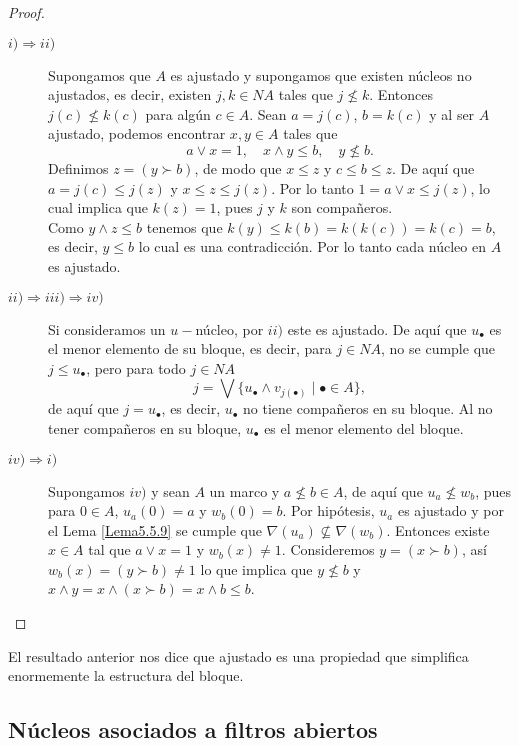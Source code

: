 \begin{proof}
    \begin{description}
        \item[$i)\Rightarrow ii) $] Supongamos que $A$ es ajustado y supongamos que existen núcleos no ajustados, es decir, existen $j, k\in NA$ tales que $j\nleq k$. Entonces $j(c)\nleq k(c)$ para algún $c\in A$. Sean $a=j(c)$, $b=k(c)$ y al ser $A$ ajustado, podemos encontrar $x, y\in A$ tales que 
        \[
        a\vee x=1,\quad x\wedge y\leq b, \quad y\nleq b.
        \]
        Definimos $z=(y\succ b)$, de modo que $x\leq z$ y $c\leq b\leq z$. De aquí que $a=j(c)\leq j(z)$ y $x\leq z\leq j(z)$. Por lo tanto $1=a\vee x\leq j(z)$, lo cual implica que $k(z)=1$, pues $j$ y $k$ son compañeros.\\

        Como $y\wedge z\leq b$ tenemos que $k(y)\leq k(b)=k(k(c))=k(c)=b$, es decir, $y\leq b$ lo cual es una contradicción. Por lo tanto cada núcleo en $A$ es ajustado.

        \item[$ii)\Rightarrow iii)\Rightarrow iv) $] Si consideramos un $u-$núcleo, por $ii)$ este es ajustado. De aquí que $u_\bullet$ es el menor elemento de su bloque, es decir, para $j\in NA$, no se cumple que $j\leq u_\bullet$, pero para todo $j\in NA$
        \[
        j=\bigvee\{u_\bullet\wedge v_{j(\bullet)}\mid \bullet \in A\},
        \]
        de aquí que $j=u_\bullet$, es decir, $u_\bullet$ no tiene compañeros en su bloque. Al no tener compañeros en su bloque, $u_\bullet$ es el menor elemento del bloque.

        \item[$iv)\Rightarrow i) $] Supongamos $iv)$ y sean $A$ un marco y $a\nleq b\in A$, de aquí que $u_a\nleq w_b$, pues para $0\in A$, $u_a(0)=a$ y $w_b(0)=b$. Por hipótesis, $u_a$ es ajustado y por el Lema \ref{Lema5.5.9} se cumple que $\nabla(u_a)\nsubseteq \nabla(w_b)$. Entonces existe $x\in A$ tal que $a\vee x=1$ y $w_b(x)\neq 1$. Consideremos $y=(x\succ b)$, así $w_b(x)=(y\succ b)\neq 1$ lo que implica que $y\nleq b$ y $x\wedge y=x\wedge (x\succ b)=x\wedge b\leq b$.
    \end{description}
\end{proof}

El resultado anterior nos dice que ajustado es una propiedad que simplifica enormemente la estructura del bloque.

\subsection{Núcleos asociados a filtros abiertos}

